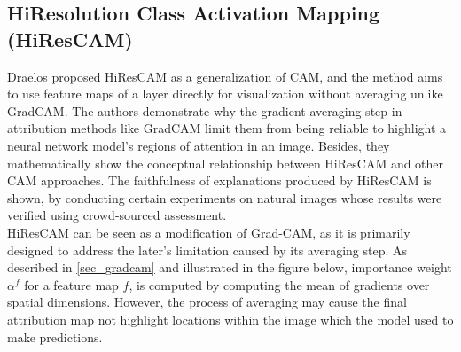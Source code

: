 \documentclass[../report.tex]{subfiles}
\begin{document}
\subsection{HiResolution Class Activation Mapping (HiResCAM)}
	Draelos \etal proposed HiResCAM \cite{draelos2020hirescam} as a generalization of CAM, and the method aims to use feature maps of a layer directly for visualization without averaging unlike GradCAM. The authors demonstrate why the gradient averaging step in attribution methods like GradCAM limit them from being reliable to highlight a neural network model’s regions of attention in an image. Besides, they mathematically show the conceptual relationship between HiResCAM and other CAM approaches. The faithfulness of explanations produced by HiResCAM is shown, by conducting certain experiments on natural images whose results were verified using crowd-sourced assessment.\\
	HiResCAM can be seen as a modification of Grad-CAM, as it is primarily designed to address the later’s limitation caused by its averaging step. As described in \ref{sec_gradcam} and illustrated in the figure below, importance weight $\alpha^f$ for a feature map $f$, is computed by computing the mean of gradients over spatial dimensions. However, the process of averaging may cause the final attribution map not highlight locations within the image which the model used to make predictions.\\
	
\end{document}
